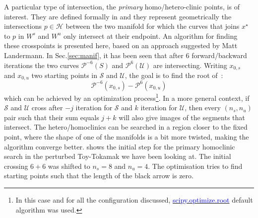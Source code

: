 A particular type of intersection, the \textit{primary} homo/hetero-clinic points, is of interest. They are defined formally in \cite[p.14]{hohloch_homoclinic_2017} and they represent geometrically the intersections $p\in\mathcal{H}$ between the two manifold for which the curves that joins $x^\star$ to $p$ in $W^s$ and $W^u$ only intersect at their endpoint. An algorithm for finding these crosspoints is presented here, based on an approach suggested by Matt Landermann. In Sec.\ref{sec:manif}, it has been seen that after $6$ forward/backward iterations the two curves $\mathcal{P}^{-6}(S)$ and $\mathcal{P}^{6}(\mathcal{U})$ are intersecting. Writing $x_{0,s}$ and $x_{0,u}$ two starting points in $\mathcal{S}$ and $\mathcal{U}$, the goal is to find the root of~:
\begin{equation*}
    \mathcal{P}^{-6}(x_{0,s}) - \mathcal{P}^{6}(x_{0,u})
\end{equation*}
which can be achieved by an optimization process\footnote{
In this case and for all the configuration discussed, \href{https://docs.scipy.org/doc/scipy/reference/generated/scipy.optimize.root.html}{\textcolor{blue}{scipy.optimize.root}} default algorithm was used.}. In a more general context, if $\mathcal{S}$ and $\mathcal{U}$ cross after $-j$ iteration for $\mathcal{S}$ and $k$ iteration for $\mathcal{U}$, then every $(n_s, n_u)$ pair such that their sum equals $j+k$ will also give images of the segments that intersect. The hetero/homoclinics can be searched in a region closer to the fixed point, where the shape of one of the manifolds is a bit more twisted, making the algorithm converge better.  shows the initial step for the primary homoclinic search in the perturbed Toy-Tokamak we have been looking at. The initial crossing $6+6$ was shifted to $n_s = 8$ and $n_u = 4$. The optimisation tries to find starting points such that the length of the black arrow is zero.
